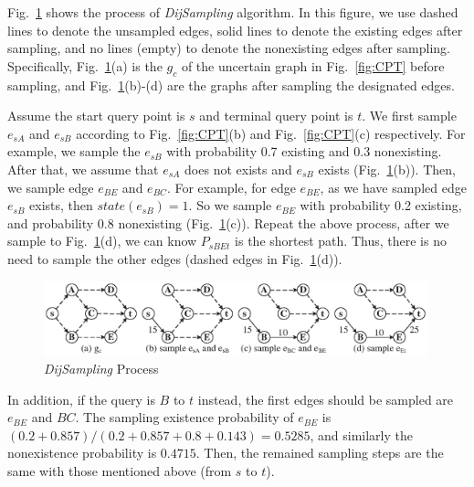 \documentclass[runningheads,a4paper]{llncs}
\begin{document}
\begin{example}
\label{eg:sampling}

Fig.~\ref{fig:sampling} shows the process of \emph{DijSampling} algorithm. In this figure, we use dashed lines to denote the unsampled edges, solid lines to denote the existing edges after sampling, and no lines (empty) to denote the nonexisting edges after sampling. Specifically, Fig.~\ref{fig:sampling}(a) is the $g_c$ of the uncertain graph in Fig.~\ref{fig:CPT} before sampling, and Fig.~\ref{fig:sampling}(b)-(d) are the graphs after sampling the designated edges.

Assume the start query point is $s$ and terminal query point is $t$. We first sample $e_{sA}$ and $e_{sB}$ according to Fig.~\ref{fig:CPT}(b) and Fig.~\ref{fig:CPT}(c) respectively. For example, we sample the $e_{sB}$ with probability 0.7 existing and 0.3 nonexisting. After that, we assume that $e_{sA}$ does not exists and $e_{sB}$ exists (Fig.~\ref{fig:sampling}(b)). Then, we sample edge $e_{BE}$ and $e_{BC}$. For example, for edge $e_{BE}$, as we have sampled edge $e_{sB}$ exists, then $state(e_{sB})=1$. So we sample $e_{BE}$ with probability 0.2 existing, and probability 0.8 nonexisting (Fig.~\ref{fig:sampling}(c)). Repeat the above process, after we sample to Fig.~\ref{fig:sampling}(d), we can know $P_{sBEt}$ is the shortest path. Thus, there is no need to sample the other edges (dashed edges in Fig.~\ref{fig:sampling}(d)).

\vspace{-0.6cm}
\begin{figure}[htbp]
\centering
  \includegraphics[width=0.99\textwidth]{fig-sample.eps}
\vspace{-0.5cm}
  \caption{\small{\emph{DijSampling} Process}}
  \label{fig:sampling}
\vspace{-0.7cm}
\end{figure}

In addition, if the query is $B$ to $t$ instead, the first edges should be sampled are $e_{BE}$ and $BC$. The sampling existence probability of $e_{BE}$ is $(0.2+0.857)/(0.2+0.857+0.8+0.143)=0.5285$, and similarly the nonexistence probability is $0.4715$. Then, the remained sampling steps are the same with those mentioned above (from $s$ to $t$).

\vspace{-0.2cm}
\end{example}
\end{document}
